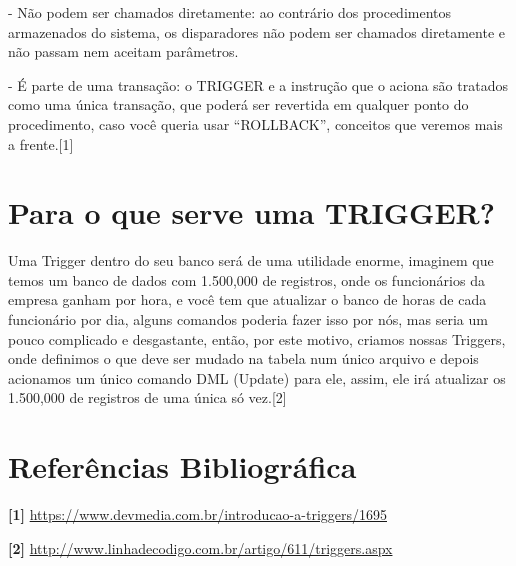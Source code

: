 \documentclass[12pt,a4paper]{article}
\begin{document}
 - Não podem ser chamados diretamente: ao contrário dos procedimentos armazenados do sistema, os disparadores não podem ser chamados diretamente e não passam nem aceitam parâmetros.
 
 - É parte de uma transação: o TRIGGER e a instrução que o aciona são tratados como uma única transação, que poderá ser revertida em qualquer ponto do procedimento, caso você queria usar “ROLLBACK”, conceitos que veremos mais a frente.[1]

\section{Para o que serve uma TRIGGER?}
Uma Trigger dentro do seu banco será de uma utilidade enorme, imaginem que temos um banco de dados com 1.500,000 de registros, onde os funcionários da empresa ganham por hora, e você tem que atualizar o banco de horas de cada funcionário por dia, alguns comandos poderia fazer isso por nós, mas seria um pouco complicado e desgastante, então, por este motivo, criamos nossas Triggers, onde definimos o que deve ser mudado na tabela num único arquivo e depois acionamos um único comando DML (Update) para ele, assim, ele irá atualizar os 1.500,000 de registros de uma única só vez.[2]

\section{Referências Bibliográfica}
\noindent \textbf{[1]} \url {https://www.devmedia.com.br/introducao-a-triggers/1695}
\\\vspace{0.2cm}

\noindent \textbf{[2]} \url {http://www.linhadecodigo.com.br/artigo/611/triggers.aspx}
\end{document}

